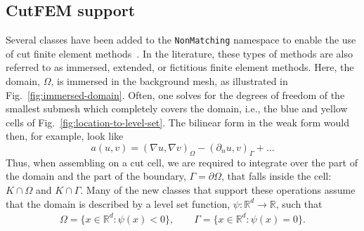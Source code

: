 \documentclass{ansarticle-preprint}
\begin{document}
\subsection{CutFEM support}\label{sec:cut}

Several classes have been added to the \texttt{NonMatching} namespace to enable the use of cut finite element methods~\cite{burman_cutfem_2015}.
In the literature, these types of methods are also referred to as immersed, extended, or fictitious finite element methods.
Here, the domain, $\Omega$, is immersed in the background mesh, as illustrated in Fig.~\ref{fig:immersed-domain}.
Often, one solves for the degrees of freedom of the smallest submesh
which completely covers the domain, i.e., the blue and yellow cells of
Fig.~\ref{fig:location-to-level-set}.
The bilinear form in the weak form would then, for example, look like
\begin{equation}
  a(u,v) = (\nabla u, \nabla v)_\Omega - (\partial_n u, v)_\Gamma + \ldots
\end{equation}
Thus, when assembling on a cut cell, we are
required to integrate over the part of the domain and the part of the boundary, $\Gamma = \partial \Omega$, that falls inside the cell:
$K\cap \Omega$ and $K \cap \Gamma$.
Many of the new classes that support these operations assume that the domain is described by a level set function,
$\psi : \mathbb{R}^d \to \mathbb{R}$, such that
\begin{align}\label{eq:levelset}
  \Omega = \{x \in \mathbb{R}^d : \psi(x)<0\},
  \qquad
  \Gamma = \{x \in \mathbb{R}^d : \psi(x) = 0\}.
\end{align}
\end{document}
